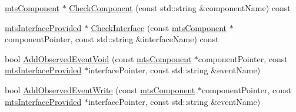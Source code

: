 {\bf }\par
\begin{DoxyCompactItemize}
\item 
\hyperlink{classmts_component}{mts\-Component} $\ast$ \hyperlink{classmts_collector_event_a37607d9e651b28e6784e36cf1042cac9}{Check\-Component} (const std\-::string \&component\-Name) const 
\item 
\hyperlink{classmts_interface_provided}{mts\-Interface\-Provided} $\ast$ \hyperlink{classmts_collector_event_a10f83def69322d0c14f924d89379b702}{Check\-Interface} (const \hyperlink{classmts_component}{mts\-Component} $\ast$component\-Pointer, const std\-::string \&interface\-Name) const 
\end{DoxyCompactItemize}

{\bf }\par
\begin{DoxyCompactItemize}
\item 
bool \hyperlink{classmts_collector_event_ab0f72db1e0a7d9da57632be533c5f09f}{Add\-Observed\-Event\-Void} (const \hyperlink{classmts_component}{mts\-Component} $\ast$component\-Pointer, const \hyperlink{classmts_interface_provided}{mts\-Interface\-Provided} $\ast$interface\-Pointer, const std\-::string \&event\-Name)
\item 
bool \hyperlink{classmts_collector_event_a73d4c8294d564becda489f6229a92665}{Add\-Observed\-Event\-Write} (const \hyperlink{classmts_component}{mts\-Component} $\ast$component\-Pointer, const \hyperlink{classmts_interface_provided}{mts\-Interface\-Provided} $\ast$interface\-Pointer, const std\-::string \&event\-Name)
\end{DoxyCompactItemize}

